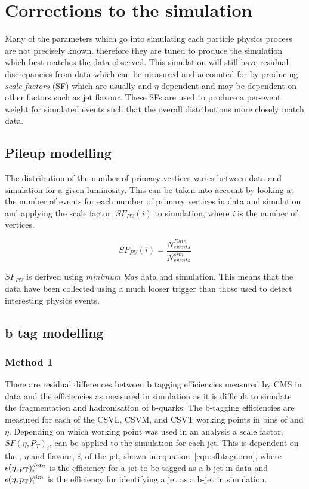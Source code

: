 \section{Corrections to the simulation}
\label{sec:Calibrations}
Many of the parameters which go into simulating each particle physics process are not precisely known. therefore they are tuned to produce the simulation which best matches the data observed. This simulation will still have residual discrepancies from data which can be measured and accounted for by producing \emph{scale factors} (SF) which are usually \pt and $\eta$ dependent and may be dependent on other factors such as jet flavour. These SFs are used to produce a per-event weight for simulated events such that the overall distributions more closely match data. 


\subsection{Pileup modelling}
\label{sec:pile-up}
The distribution of the number of primary vertices varies between data and simulation for a given luminosity. This can be taken into account by looking at the number of events for each number of primary vertices in data and simulation and applying the scale factor, $SF_{PU}\left( i \right)$ to simulation, where \emph{i} is the number of vertices.

\begin{equation}
SF_{PU}\left( i \right) = \frac{N_{events}^{Data}}{  N_{events}^{sim}} 
\label{eqn:PUSF}
\end{equation}

$SF_{PU}$ is derived using \emph{minimum bias} data and simulation. This means that the data have been collected using a much looser trigger than those used to detect interesting physics events. 

\subsection{b tag modelling ~\label{sec:btagModelling}}

\subsubsection{Method 1 ~\label{subsec:method1btag}}
There are residual differences between b tagging efficiencies measured by CMS in data and the efficiencies as measured in simulation as it is difficult to simulate the fragmentation and hadronisation of b-quarks. 
The b-tagging efficiencies are measured for each of the CSVL, CSVM, and CSVT working points in bins of \pt and $\eta$. Depending on which working point was used in an analysis a scale factor, $SF(\eta, P_{T})_{i}$,  can be applied to the simulation for each jet. This is dependent on the \pt, $\eta$ and flavour, \emph{i}, of the jet, shown in equation~\ref{eqn:sfbtagnorm}, where $\epsilon(\eta , p_{\mathrm{T}})^{data}_{i}$ is the efficiency for a jet to be tagged as a b-jet in data and $\epsilon(\eta , p_{\mathrm{T}})^{sim}_{i}$ is the efficiency for identifying a jet as a b-jet in simulation.

